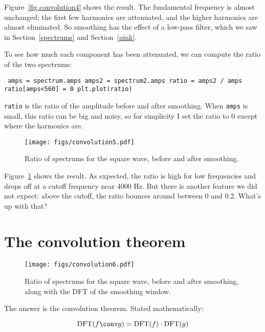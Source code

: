 \documentclass[12pt]{book} \usepackage[width=5.5in,height=8.5in, hmarginratio=3:2,vmarginratio=1:1]{geometry}
\begin{document}
Figure~\ref{fig.convolution4} shows the result. The fundamental frequency is almost unchanged; the first few harmonics are attenuated, and the higher harmonics are almost eliminated. So smoothing has the effect of a low-pass filter, which we saw in Section~\ref{spectrums} and Section~\ref{pink}. 

To see how much each component has been attenuated, we can compute the ratio of the two spectrums: 

\begin{verbatim} amps = spectrum.amps amps2 = spectrum2.amps ratio = amps2 / amps ratio[amps<560] = 0 plt.plot(ratio) \end{verbatim} 

{\tt ratio} is the ratio of the amplitude before and after smoothing. When {\tt amps} is small, this ratio can be big and noisy, so for simplicity I set the ratio to 0 except where the harmonics are. 

\begin{figure} 

\centerline{\texttt{[image: figs/convolution5.pdf]}} \caption{Ratio of spectrums for the square wave, before and after smoothing.} \label{fig.convolution5} \end{figure} 

Figure~\ref{fig.convolution5} shows the result. As expected, the ratio is high for low frequencies and drops off at a cutoff frequency near 4000 Hz. But there is another feature we did not expect: above the cutoff, the ratio bounces around between 0 and 0.2. What's up with that? 

\section{The convolution theorem} \label{convtheorem} 

\begin{figure} 

\centerline{\texttt{[image: figs/convolution6.pdf]}} \caption{Ratio of spectrums for the square wave, before and after smoothing, along with the DFT of the smoothing window.} \label{fig.convolution6} \end{figure} 

\newcommand{\DFT}{\mathrm{DFT}} \newcommand{\IDFT}{\mathrm{IDFT}} 

The answer is the convolution theorem. Stated mathematically: 

%
\[ \DFT(f \conv g) = \DFT(f) \cdot \DFT(g) \] 
\end{document}
